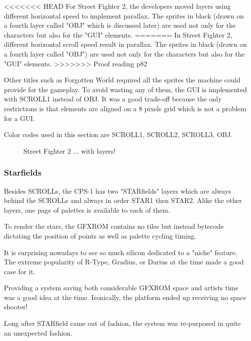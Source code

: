 <<<<<<< HEAD
For Street Fighter 2, the developers moved layers using different horizontal speed to implement parallax. The sprites in black (drawn on a fourth layer called "OBJ" which is discussed later) are used not only for the characters but also for the "GUI" elements.
=======
In Street Fighter 2, different horizontal scroll speed result in parallax. The sprites in black (drawn on a fourth layer called "OBJ") are used not only for the characters but also for the "GUI" elements.
>>>>>>> Proof reading p82

Other titles such as Forgotten World required all the sprites the machine could provide for the gameplay. To avoid wasting any of them, the GUI is implemented with SCROLL1 instead of OBJ. It was a good trade-off because the only restrictions is that elements are aligned on a 8 pixels grid which is not a problem for a GUI.

Color codes used in this section are  SCROLL1,  SCROLL2,  SCROLL3,  OBJ.

\vfill
\begin{figure}[!b]
 \caption*{Street Fighter 2 ... with layers!}%
 \end{figure}%
\pagebreak


\subsubsection{Starfields}
Besides SCROLLs, the CPS-1 has two "STARfields" layers which are always behind the SCROLLs and always in order STAR1 then STAR2. Alike the other layers, one page of palettes is available to each of them.

To render the stars, the GFXROM contains no tiles but instead bytecode dictating the position of points as well as palette cycling timing.

It is surprising nowadays to see so much silicon dedicated to a "niche" feature. The extreme popularity of R-Type, Gradius, or Darius at the time made a good case for it.

Providing a system saving both considerable GFXROM space and artists time was a good idea at the time. Ironically, the platform ended up receiving no space shooter! 

Long after STARfield came out of fashion, the system was re-purposed in quite an unexpected fashion.

